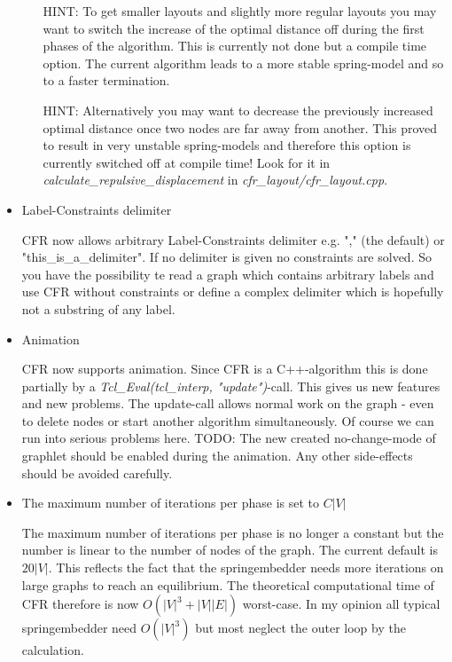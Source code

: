\documentclass[notitlepage,fleqn]{article}
\begin{document}
\begin{itemize}
\begin{itemize}
  HINT: To get smaller layouts and slightly more regular layouts
  you may want to switch
  the increase of the optimal distance off during the first phases
  of the algorithm.
  This is currently not done but a compile time option.
  The current algorithm leads to a more stable spring-model and so
  to a faster termination.

  HINT: Alternatively you may want to decrease the previously
  increased optimal distance once two nodes are far away from
  another. This proved to result in very unstable spring-models
  and therefore this option is currently 
  switched off at compile time! Look for it in 
  {\em calculate\_repulsive\_displacement} in 
  {\em cfr\_layout/cfr\_layout.cpp}.

\end{itemize}
\item Label-Constraints delimiter

  CFR now allows arbitrary Label-Constraints delimiter e.g. ","
  (the default) or "this\_is\_a\_delimiter". If no delimiter is given no
  constraints are solved. So you have the possibility te read a
  graph which contains arbitrary labels and use CFR without constraints or
  define a complex delimiter which is hopefully not a substring of any label.
\item Animation

  CFR now supports animation. Since CFR is a C++-algorithm this is
  done partially by a {\em Tcl\_Eval(tcl\_interp, "update")}-call.
  This gives us new features and new problems. The update-call allows
  normal work on the graph - even to delete nodes or start another
  algorithm simultaneously. Of course we can run into serious problems
  here. TODO: The new created no-change-mode of graphlet should be
  enabled during the animation. Any other side-effects should be
  avoided carefully.

\item The maximum number of iterations per phase is set to $C|V|$

  The maximum number of iterations per phase is no longer
  a constant but the number is linear to the number of nodes of the
  graph. The current default is $20|V|$. This reflects the fact that
  the springembedder needs more iterations on large graphs to reach
  an equilibrium. The theoretical computational time of CFR therefore
  is now $O(|V|^3+|V||E|)$ worst-case. 
  In my opinion all typical springembedder
  need $O(|V|^3)$ but most neglect the outer loop by the calculation.
\end{itemize}
\end{document}
